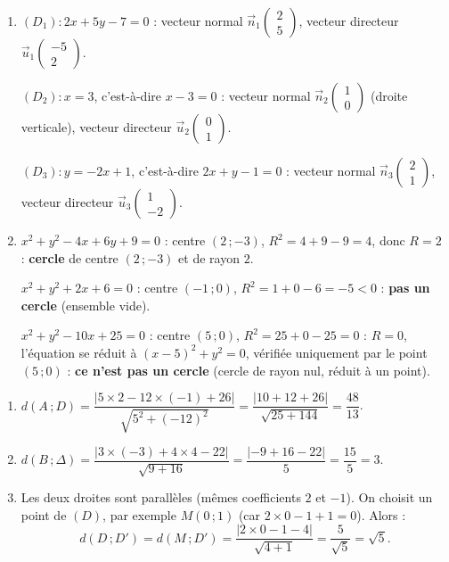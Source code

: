 \documentclass[11pt]{article}
\begin{document}
\begin{corrige}
\begin{enumerate}
\item $(D_1):2x+5y-7=0$ : vecteur normal $\vec{n}_1\begin{pmatrix} 2 \\ 5 \end{pmatrix}$, vecteur directeur $\vec{u}_1\begin{pmatrix} -5 \\ 2 \end{pmatrix}$.

$(D_2):x=3$, c'est-à-dire $x-3=0$ : vecteur normal $\vec{n}_2\begin{pmatrix} 1 \\ 0 \end{pmatrix}$ (droite verticale), vecteur directeur $\vec{u}_2\begin{pmatrix} 0 \\ 1 \end{pmatrix}$.

$(D_3):y=-2x+1$, c'est-à-dire $2x+y-1=0$ : vecteur normal $\vec{n}_3\begin{pmatrix} 2 \\ 1 \end{pmatrix}$, vecteur directeur $\vec{u}_3\begin{pmatrix} 1 \\ -2 \end{pmatrix}$.
\item $x^2+y^2-4x+6y+9=0$ : centre $(2\,;-3)$, $R^2=4+9-9=4$, donc $R=2$ : \textbf{cercle} de centre $(2\,;-3)$ et de rayon $2$.

$x^2+y^2+2x+6=0$ : centre $(-1\,;0)$, $R^2=1+0-6=-5<0$ : \textbf{pas un cercle} (ensemble vide).

$x^2+y^2-10x+25=0$ : centre $(5\,;0)$, $R^2=25+0-25=0$ : $R=0$, l'équation se réduit à $(x-5)^2+y^2=0$, vérifiée uniquement par le point $(5\,;0)$ : \textbf{ce n'est pas un cercle} (cercle de rayon nul, réduit à un point).
\end{enumerate}
\end{corrige}

\begin{corrige}
\begin{enumerate}
\item $d(A\,;D)=\dfrac{|5\times 2-12\times(-1)+26|}{\sqrt{5^2+(-12)^2}}=\dfrac{|10+12+26|}{\sqrt{25+144}}=\dfrac{48}{13}$.
\item $d(B\,;\Delta)=\dfrac{|3\times(-3)+4\times 4-22|}{\sqrt{9+16}}=\dfrac{|-9+16-22|}{5}=\dfrac{15}{5}=3$.
\item Les deux droites sont parallèles (mêmes coefficients $2$ et $-1$). On choisit un point de $(D)$, par exemple $M(0\,;1)$ (car $2\times 0-1+1=0$). Alors :
\[ d(D\,;D')=d(M\,;D')=\dfrac{|2\times 0-1-4|}{\sqrt{4+1}}=\dfrac{5}{\sqrt{5}}=\sqrt{5}. \]
\end{enumerate}
\end{corrige}
\end{document}
